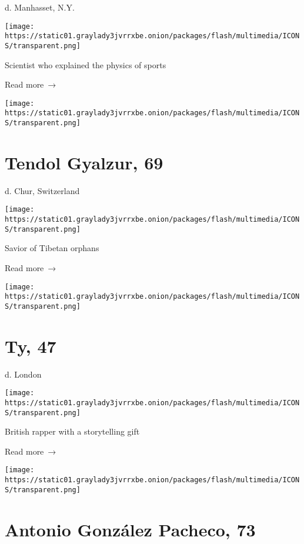 d. Manhasset, N.Y.

\texttt{[image: https://static01.graylady3jvrrxbe.onion/packages/flash/multimedia/ICONS/transparent.png]}

Scientist who explained the physics of sports

 Read more~→

\href{https://www.nytimes3xbfgragh.onion/2020/05/15/obituaries/tendol-gyalzur-dead-coronavirus.html}{}

\texttt{[image: https://static01.graylady3jvrrxbe.onion/packages/flash/multimedia/ICONS/transparent.png]}

\hypertarget{tendol-gyalzur-69}{%
\section{Tendol Gyalzur, 69}\label{tendol-gyalzur-69}}

d. Chur, Switzerland

\texttt{[image: https://static01.graylady3jvrrxbe.onion/packages/flash/multimedia/ICONS/transparent.png]}

Savior of Tibetan orphans

 Read more~→

\href{https://www.nytimes3xbfgragh.onion/2020/05/15/obituaries/ty-dead.html}{}

\texttt{[image: https://static01.graylady3jvrrxbe.onion/packages/flash/multimedia/ICONS/transparent.png]}

\hypertarget{ty-47}{%
\section{Ty, 47}\label{ty-47}}

d. London

\texttt{[image: https://static01.graylady3jvrrxbe.onion/packages/flash/multimedia/ICONS/transparent.png]}

British rapper with a storytelling gift

 Read more~→

\href{https://www.nytimes3xbfgragh.onion/2020/05/15/obituaries/antonio-gonzalez-pacheco-accused-policeman-in-francos-spain-dies-at-73.html}{}

\texttt{[image: https://static01.graylady3jvrrxbe.onion/packages/flash/multimedia/ICONS/transparent.png]}

\hypertarget{antonio-gonzuxe1lez-pacheco-73}{%
\section{Antonio González Pacheco,
73}\label{antonio-gonzuxe1lez-pacheco-73}}


